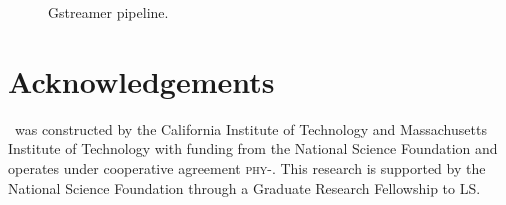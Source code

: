 \documentclass[portrait,plainboxedsections]{sciposter}
\begin{document}
\begin{multicols}{3}
\begin{figure}
\centering
\caption{Gstreamer pipeline.}
\label{f:gstreamer_pipeline}
\end{figure}

\section{Acknowledgements}

\LIGO\ was constructed by the California Institute of Technology and
Massachusetts Institute of Technology with funding from the National Science
Foundation and operates under cooperative agreement
\textsc{phy}-. This research
is supported by the National Science Foundation through a Graduate Research
Fellowship to LS.





\end{multicols}
\end{document}
